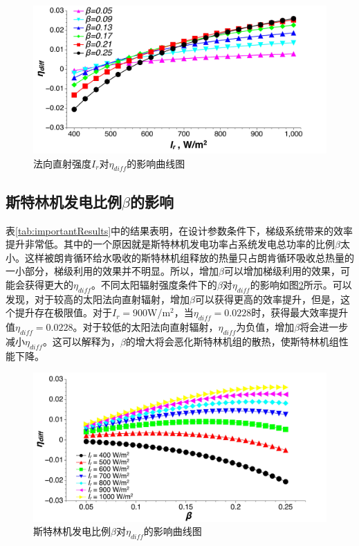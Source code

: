 
\noindent \begin{figure}[htbp]
\begin{center}
	\includegraphics[width = 0.8\columnwidth, angle = 0]{fig/I_r-eta_diff}
	\caption{法向直射强度$I_r$对$\eta_{diff}$的影响曲线图}
	\label{fig:I_r-eta_diff}
\end{center}
\end{figure}

\subsection{斯特林机发电比例$\beta$的影响}

表\ref{tab:importantResults}中的结果表明，在设计参数条件下，梯级系统带来的效率提升非常低。其中的一个原因就是斯特林机发电功率占系统发电总功率的比例$\beta$太小。这样被朗肯循环给水吸收的斯特林机组释放的热量只占朗肯循环吸收总热量的一小部分，梯级利用的效果并不明显。所以，增加$\beta$可以增加梯级利用的效果，可能会获得更大的$\eta_{diff}$。不同太阳辐射强度条件下的$\beta$对$\eta_{diff}$的影响如图\ref{fig:beta-eta_diff}所示。可以发现，对于较高的太阳法向直射辐射，增加$\beta$可以获得更高的效率提升，但是，这个提升存在极限值。对于$I_r=900$W/m$^2$，当$\eta_{diff}=0.0228$时，获得最大效率提升值$\eta_{diff}=0.0228$。对于较低的太阳法向直射辐射，$\eta_{diff}$为负值，增加$\beta$将会进一步减小$\eta_{diff}$。这可以解释为，$\beta$的增大将会恶化斯特林机组的散热，使斯特林机组性能下降。

\noindent \begin{figure}[H]
\begin{center}
	\includegraphics[width = 0.8\columnwidth, angle = 0]{fig/beta-eta_diff}
	\caption{斯特林机发电比例$\beta$对$\eta_{diff}$的影响曲线图}
	\label{fig:beta-eta_diff}
\end{center}
\end{figure}

